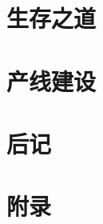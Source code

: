 \documentclass[cn,ctexfont,fancy,newtx]{colorful}
\begin{document}
\part{生存之道}

\part{产线建设}

\part{后记}

\part{附录}
\appendix








\end{document}
